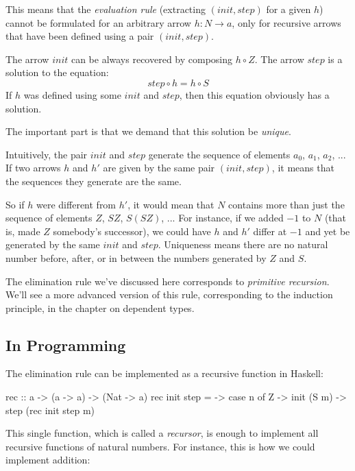\documentclass[DaoFP]{subfiles}
\begin{document}
This means that the \emph{evaluation rule} (extracting $(\mathit{init}, \mathit{step})$ for a given $h$) cannot be formulated for an arbitrary arrow $h \colon N \to a$, only for recursive arrows that have been defined using a pair $(\mathit{init}, \mathit{step})$. 

The arrow $\mathit{init}$ can be always recovered by composing $h \circ Z$. The arrow $\mathit{step}$ is a solution to the equation:
\[ \mathit{step} \circ h = h \circ S \]
If $h$ was defined using some $\mathit{init}$ and $\mathit{step}$, then this equation obviously has a solution. 

The important part is that we demand that this solution be \emph{unique}. 

Intuitively, the pair $\mathit{init}$ and $\mathit{step}$ generate the sequence of elements $a_0$, $a_1$, $a_2$, ... If two arrows $h$ and $h'$ are given by the same pair $(\mathit{init}, \mathit{step})$, it means that the sequences they generate are the same. 

So if $h$ were different from $h'$, it would mean that $N$ contains more than just the sequence of elements $Z$, $S Z$, $S(S Z)$, ... For instance, if we added $-1$ to $N$ (that is, made $Z$ somebody's successor), we could have $h$ and $h'$ differ at $-1$ and yet be generated by the same $\mathit{init}$ and $\mathit{step}$. Uniqueness means there are no natural number before, after, or in between the numbers generated by $Z$ and $S$.

The elimination rule we've discussed here corresponds to \emph{primitive recursion}. We'll see a more advanced version of this rule, corresponding to the induction principle, in the chapter on dependent types.

\subsection{In Programming}

The elimination rule can be implemented as a recursive function in Haskell:

\begin{haskell}
rec :: a -> (a -> a) -> (Nat -> a)
rec init step = \n ->
  case n of
    Z     -> init
    (S m) -> step (rec init step m)
\end{haskell}

This single function, which is called a \emph{recursor}, is enough to implement all recursive functions of natural numbers. For instance, this is how we could implement addition:
\end{document}
